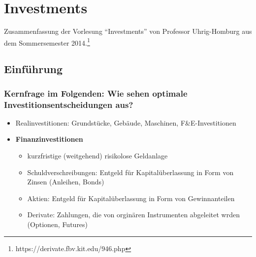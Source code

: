 \chapter{Investments}

Zusammenfassung der Vorlesung "`Investments"' von Professor Uhrig-Homburg aus dem Sommersemester 2014.\footnote{https://derivate.fbv.kit.edu/946.php}

\section{Einführung}

\subsection{Kernfrage im Folgenden: Wie sehen optimale Investitionsentscheidungen aus?}
\begin{itemize}
	\item Realinvestitionen: Grundstücke, Gebäude, Maschinen, F\&E-Investitionen
	\item \textbf{Finanzinvestitionen}
	\begin{itemize}
		\item kurzfristige (weitgehend) risikolose Geldanlage
		\item Schuldverschreibungen: Entgeld für Kapitalüberlassung in Form von Zinsen (Anleihen, Bonds)
		\item Aktien: Entgeld für Kapitalüberlassung in Form von Gewinnanteilen
		\item Derivate: Zahlungen, die von orginären Instrumenten abgeleitet wrden (Optionen, Futures)
	\end{itemize}
\end{itemize}

